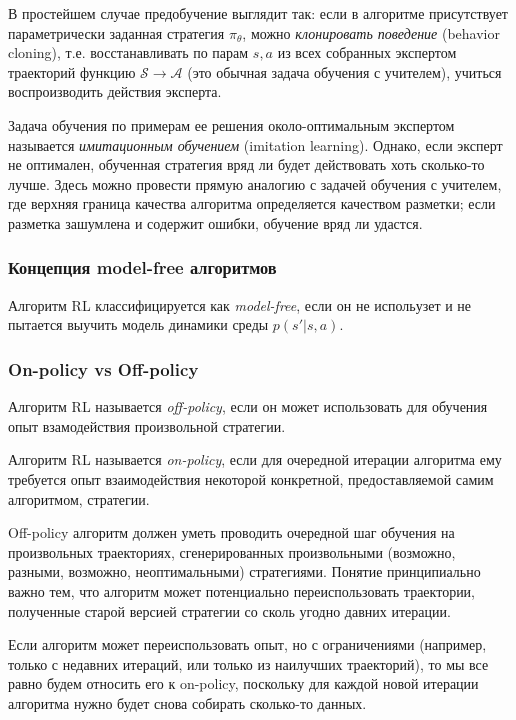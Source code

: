 \documentclass[%
	11pt,
	a4paper,
	utf8,
		]{article}
\begin{document}
В простейшем случае предобучение выглядит так: если в алгоритме присутствует параметрически заданная стратегия $ \pi_{\theta} $, можно \emph{клонировать поведение} (behavior cloning), т.е. восстанавливать по парам $ s, a $ из всех собранных экспертом траекторий функцию $ \mathcal{S} \rightarrow \mathcal{A} $ (это обычная задача обучения с учителем), учиться воспроизводить действия эксперта.

Задача обучения по примерам ее решения около-оптимальным экспертом называется \emph{имитационным обучением} (imitation learning). Однако, если эксперт не оптимален, обученная стратегия вряд ли будет действовать хоть сколько-то лучше. Здесь можно провести прямую аналогию с задачей обучения с учителем, где верхняя граница качества алгоритма определяется качеством разметки; если разметка зашумлена и содержит ошибки, обучение вряд ли удастся.

\subsubsection{Концепция model-free алгоритмов}

Алгоритм RL классифицируется как \emph{model-free}, если он не испольузет и не пытается выучить модель динамики среды $ p(s' | s, a) $.

\subsubsection{On-policy vs Off-policy}

Алгоритм RL называется \emph{off-policy}, если он может использовать для обучения опыт взамодействия произвольной стратегии.

Алгоритм RL называется \emph{on-policy}, если для очередной итерации алгоритма ему требуется опыт взаимодействия некоторой конкретной, предоставляемой самим алгоритмом, стратегии.

Off-policy алгоритм должен уметь проводить очередной шаг обучения на произвольных траекториях, сгенерированных произвольными (возможно, разными, возможно, неоптимальными) стратегиями. Понятие принципиально важно тем, что алгоритм может потенциально переиспользовать траектории, полученные старой версией стратегии со сколь угодно давних итерации.

Если алгоритм может переиспользовать опыт, но с ограничениями (например, только с недавних итераций, или только из наилучших траекторий), то мы все равно будем относить его к on-policy, поскольку для каждой новой итерации алгоритма нужно будет снова собирать сколько-то данных. 
\end{document}
